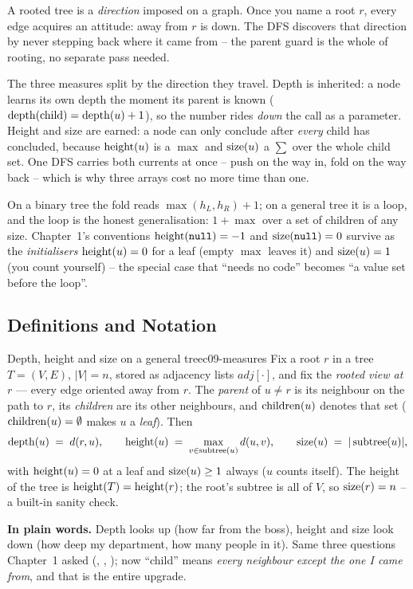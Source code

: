 A rooted tree is a \emph{direction} imposed on a graph. Once you name a root $r$, every
edge acquires an attitude: away from $r$ is down. The DFS discovers that direction by
never stepping back where it came from -- the parent guard is the whole of rooting, no
separate pass needed.

The three measures split by the direction they travel. Depth is inherited: a node learns
its own depth the moment its parent is known ($\operatorname{depth}(\text{child})=\operatorname{depth}(u)+1$), so the
number rides \emph{down} the call as a parameter. Height and size are earned: a node can
only conclude after \emph{every} child has concluded, because $\operatorname{height}(u)$ is a $\max$ and
$\operatorname{size}(u)$ a $\sum$ over the whole child set. One DFS carries both currents at once --
push on the way in, fold on the way back -- which is why three arrays cost no more time
than one.

On a binary tree the fold reads $\max(h_L,h_R)+1$; on a general tree it is a loop, and
the loop is the honest generalisation: $1+\max$ over a set of children of any size.
Chapter~1's conventions $\operatorname{height}(\texttt{null})=-1$ and $\operatorname{size}(\texttt{null})=0$ survive as the
\emph{initialisers} $\operatorname{height}(u)=0$ for a leaf (empty $\max$ leaves it) and $\operatorname{size}(u)=1$
(you count yourself) -- the special case that ``needs no code'' becomes ``a value set
before the loop''.

\subsection{Definitions and Notation}

\begin{definition}{Depth, height and size on a general tree}{c09-measures}
Fix a root $r$ in a tree $T=(V,E)$, $|V|=n$, stored as adjacency lists
$\mathit{adj}[\cdot]$, and fix the \emph{rooted view at $r$} --- every edge oriented
away from $r$. The
\emph{parent} of $u\ne r$ is its neighbour on the path to $r$, its \emph{children} are its
other neighbours, and $\operatorname{children}(u)$ denotes that set ($\operatorname{children}(u)=\emptyset$ makes $u$
a \emph{leaf}). Then
\[
  \operatorname{depth}(u) \;=\; d(r,u),\qquad
  \operatorname{height}(u) \;=\; \max_{v\in\operatorname{subtree}(u)} d(u,v),\qquad
  \operatorname{size}(u) \;=\; |\operatorname{subtree}(u)|,
\]
with $\operatorname{height}(u)=0$ at a leaf and $\operatorname{size}(u)\ge 1$ always ($u$ counts itself). The height
of the tree is $\operatorname{height}(T)=\operatorname{height}(r)$; the root's subtree is all of $V$, so $\operatorname{size}(r)=n$
-- a built-in sanity check.
\end{definition}

\noindent\textbf{In plain words.} Depth looks up (how far from the boss), height and size
look down (how deep my department, how many people in it). Same three questions Chapter~1
asked (, , ); now ``child'' means
\emph{every neighbour except the one I came from}, and that is the entire upgrade.

